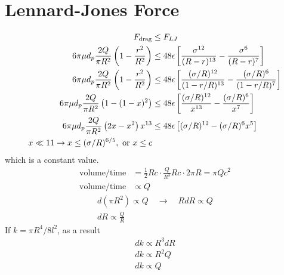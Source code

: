 \section{Lennard-Jones Force}
%
\begin{align}
    F_{\text{drag}} &\leq F_{LJ}\\
  6\pi \mu d_{p} \frac{2Q}{\pi R^2} \left( 1- \frac{r^2}{R^2} \right) & \leq 48\epsilon \left[ \frac{\sigma^{12}}{(R-r)^{13}} - \frac{\sigma^{6}}{(R-r)^{7}}  \right] \\
  6\pi \mu d_{p} \frac{2Q}{\pi R^2} \left( 1- \frac{r^2}{R^2} \right) & \leq 48\epsilon \left[ \frac{(\sigma/R)^{12}}{(1-r/R)^{13}} - \frac{(\sigma/R)^{6}}{(1-r/R)^{7}}  \right] \\
  6\pi \mu d_{p} \frac{2Q}{\pi R^2} \left( 1- (1-x)^2\right) & \leq 48\epsilon \left[ \frac{(\sigma/R)^{12}}{x^{13}} - \frac{(\sigma/R)^{6}}{x^{7}}  \right] \\
  6\pi \mu d_{p} \frac{2Q}{\pi R^2} \left( 2x-x^2\right) x^{13} & \leq 48\epsilon \left[ {(\sigma/R)^{12}} - {(\sigma/R)^{6}x^{5}}  \right] \\
  x\ll1 1 \to x \leq {(\sigma/R)^{6/5}} , \text{ or } x\leq c
\end{align}
%
which is a constant value. 
%
\begin{align}
  \text{volume}/\text{time} &= \frac{1}{2} R c \cdot \frac{Q}{R^{3}} R c \cdot 2\pi R = \pi Q c^{2}  \\
  \text{volume}/\text{time} & \propto {Q} 
\end{align}
%
%
\begin{align}
  d (\pi R^2) \propto Q \quad \to \quad R dR \propto Q \\
  dR \propto  \frac{Q}{R}
\end{align}
%
If $k = \pi R^4/8l^2$, as a result
%
\begin{align}
  dk \propto R^{3} dR \\
  dk \propto R^2 Q \\
  dk \propto Q
\end{align}
%





